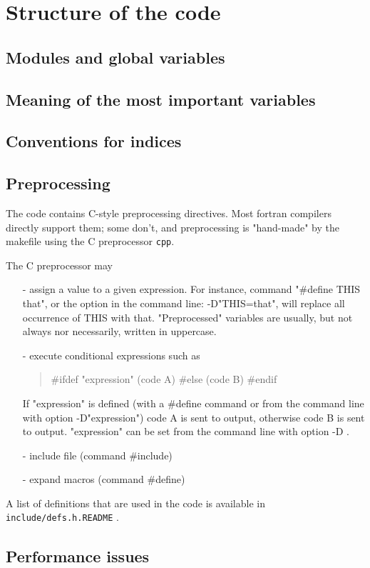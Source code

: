 \documentclass[12pt]{article}
\begin{document}
\section{Structure of the code}
\subsection{Modules and global variables}
\subsection{Meaning of the most important variables}
\subsection{Conventions for indices}
\subsection{Preprocessing}

The code contains C-style preprocessing directives. Most
fortran compilers directly support them; some don't, and
preprocessing is "hand-made" by the makefile using the C
preprocessor {\tt cpp}.

The C preprocessor may
\begin{itemize}
\item[-] assign a value to a given expression. For instance, command
  "\#define THIS that", or the option in the command line:
  -D"THIS=that", will replace all occurrence of THIS with that.
  "Preprocessed" variables are usually, but not always nor 
   necessarily,  written in uppercase.
\item[-] execute conditional expressions such as
\begin{quote}
  \#ifdef "expression" 
  (code A) 
  \#else
  (code B)
  \#endif
\end{quote}
  If "expression" is defined (with a \#define command or from the 
  command line with option -D"expression") code A is sent to
  output, otherwise code B is sent to output.
  "expression" can be set from the command line with option -D .
\item[-] include file (command \#include)
\item[-] expand macros (command \#define)
\end{itemize}
A list of definitions that are used in the code is available 
in {\tt include/defs.h.README} .

\subsection{Performance issues}
\end{document}
